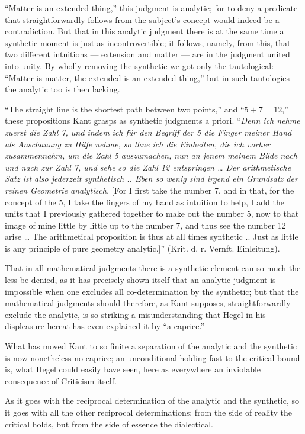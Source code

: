 \documentclass[12pt]{book}
\begin{document}
``Matter is an extended thing,'' this judgment is analytic; for to deny a predicate that straightforwardly
follows from the subject's concept would indeed be a contradiction. But that in this analytic judgment
there is at the same time a synthetic moment is just as incontrovertible; it follows, namely, from this,
that two different intuitions --- extension and matter --- are in the judgment united into unity. By
wholly removing the synthetic we got only the tautological: ``Matter is matter, the extended is an
extended thing,'' but in such tautologies the analytic too is then lacking.

``The straight line is the shortest path between two points,'' and ``$5 + 7 = 12$,'' these propositions
Kant grasps as synthetic judgments a priori. ``\textit{Denn ich nehme zuerst die Zahl 7, und indem ich
für den Begriff der 5 die Finger meiner Hand als Anschauung zu Hilfe nehme, so thue ich die Einheiten,
die ich vorher zusammennahm, um die Zahl 5 auszumachen, nun an jenem meinem Bilde nach und nach zur Zahl
7, und sehe so die Zahl 12 entspringen \ldots{} Der arithmetische Satz ist also jederzeit synthetisch ..
Eben so wenig sind irgend ein Grundsatz der reinen Geometrie analytisch.} [For I first take the number 7,
and in that, for the concept of the 5, I take the fingers of my hand as intuition to help, I add the
units that I previously gathered together to make out the number 5, now to that image of mine little by
little up to the number 7, and thus see the number 12 arise \ldots{} The arithmetical proposition is thus
at all times synthetic .. Just as little is any principle of pure geometry analytic.]'' (Krit. d. r.
Vernft. Einleitung).

That in all mathematical judgments there is a synthetic element can so much the less be denied, as it has
precisely
shown itself that an analytic judgment is impossible when one excludes all co-determination by the
synthetic; but that the mathematical judgments should therefore, as Kant supposes, straightforwardly
exclude the analytic, is so striking a misunderstanding that Hegel in his displeasure hereat has even
explained it by ``a caprice.''

What has moved Kant to so finite a separation of the analytic and the synthetic is now nonetheless no
caprice; an unconditional holding-fast to the critical bound is, what Hegel could easily have seen, here
as everywhere an inviolable consequence of Criticism itself.

As it goes with the reciprocal determination of the analytic and the synthetic, so it goes with all the
other reciprocal determinations: from the side of reality the critical holds, but from the side of
essence the dialectical.
\end{document}
